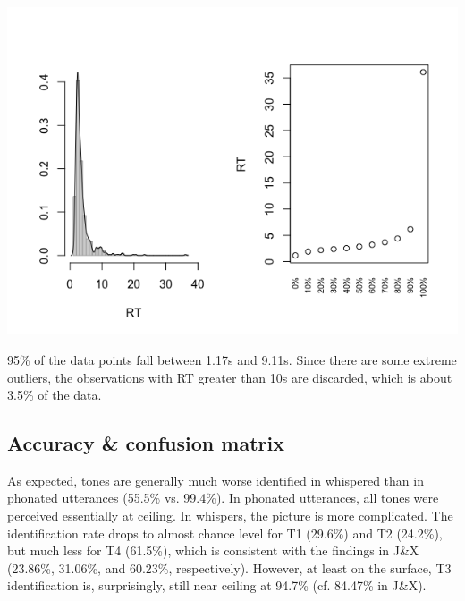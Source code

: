 \documentclass[12pt,letterpaper]{scrartcl}
\begin{document}
\begin{center}
    \includegraphics[scale=0.45]{data_pruning}
    \label{RT}
\end{center}

95\% of the data points fall between 1.17s and 9.11s. Since there are some extreme outliers, the observations with RT greater than 10s are discarded, which is about 3.5\% of the data.

\subsection{Accuracy \& confusion matrix}

As expected, tones are generally much worse identified in whispered than in phonated utterances (55.5\% vs. 99.4\%). In phonated utterances, all tones were perceived essentially at ceiling. In whispers, the picture is more complicated.  The identification rate drops to almost chance level for T1 (29.6\%) and T2 (24.2\%), but much less for T4 (61.5\%), which is consistent with the findings in J\&X (23.86\%, 31.06\%, and 60.23\%, respectively). However, at least on the surface, T3 identification is, surprisingly, still near ceiling at 94.7\% (cf. 84.47\% in J\&X).
\end{document}

